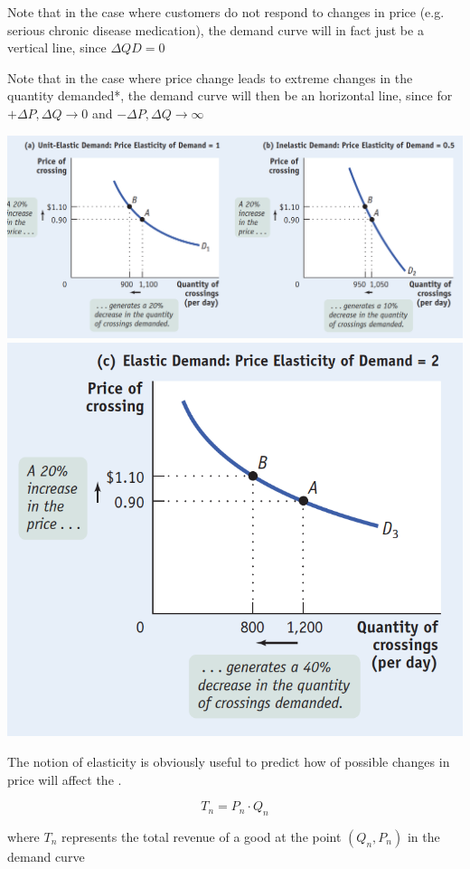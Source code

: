 \documentclass[english,course,draft]{Notes}
\begin{document}
\par{Note that in the case where customers do not respond to changes in price (e.g. serious chronic disease medication), the demand curve will in fact just be a vertical line, since $\Delta QD = 0$}


\par{Note that in the case where  price change leads to extreme changes in the quantity demanded*, the demand curve will then be an horizontal line, since for $+\Delta P , \Delta Q \to 0$ and  $-\Delta P, \Delta Q \to \infty$} 



              \includegraphics[width=0.65\linewidth]{elasticGrad} \includegraphics[width=0.335\linewidth]{elasticGrad2}

\par{The notion of elasticity is obviously useful to predict how of possible changes in price will affect the .}


$$T_n = P_n \cdot Q_n$$ 

\par{where $T_n$ represents the total revenue of a good at the point $(Q_n,P_n)$ in the demand curve}\\
\end{document}
